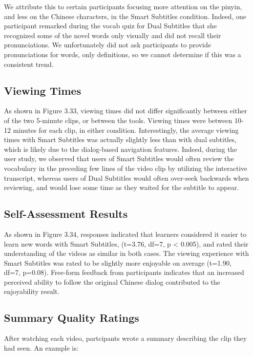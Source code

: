 \documentclass{sigchi}
\begin{document}
We attribute this to certain participants focusing more attention on the pinyin, and less on the Chinese characters, in the Smart Subtitles condition. Indeed, one participant remarked during the vocab quiz for Dual Subtitles that she recognized some of the novel words only visually and did not recall their pronunciations. We unfortunately did not ask participants to provide pronunciations for words, only definitions, so we cannot determine if this was a consistent trend.

\subsection{Viewing Times}

As shown in Figure 3.33, viewing times did not differ significantly between either of the two 5-minute clips, or between the tools. Viewing times were between 10-12 minutes for each clip, in either condition. Interestingly, the average viewing times with Smart Subtitles was actually slightly less than with dual subtitles, which is likely due to the dialog-based navigation features. Indeed, during the user study, we observed that users of Smart Subtitles would often review the vocabulary in the preceding few lines of the video clip by utilizing the interactive transcript, whereas users of Dual Subtitles would often over-seek backwards when reviewing, and would lose some time as they waited for the subtitle to appear.

\subsection{Self-Assessment Results}

As shown in Figure 3.34, responses indicated that learners considered it easier to learn new words with Smart Subtitles, (t=3.76, df=7, p < 0.005), and rated their understanding of the videos as similar in both cases. The viewing experience with Smart Subtitles was rated to be slightly more enjoyable on average (t=1.90, df=7, p=0.08). Free-form feedback from participants indicates that an increased perceived ability to follow the original Chinese dialog contributed to the enjoyability result.

\subsection{Summary Quality Ratings}

After watching each video, partcipants wrote a summary describing the clip they had seen. An example is:
\end{document}
